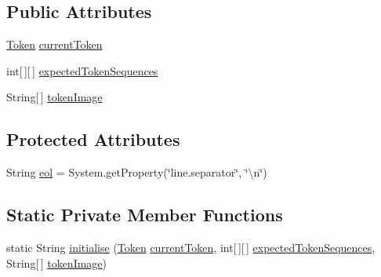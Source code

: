 \subsection*{Public Attributes}
\begin{DoxyCompactItemize}
\item 
\hyperlink{classuk_1_1ac_1_1manchester_1_1cs_1_1owl_1_1owlapi_1_1turtle_1_1parser_1_1_token}{Token} \hyperlink{classuk_1_1ac_1_1manchester_1_1cs_1_1owl_1_1owlapi_1_1turtle_1_1parser_1_1_parse_exception_a3a9b65aacfb71f6029fd7fd37fdcc633}{current\-Token}
\item 
int\mbox{[}$\,$\mbox{]}\mbox{[}$\,$\mbox{]} \hyperlink{classuk_1_1ac_1_1manchester_1_1cs_1_1owl_1_1owlapi_1_1turtle_1_1parser_1_1_parse_exception_a08ab7f2d8391b1238530a95a82e17dfc}{expected\-Token\-Sequences}
\item 
String\mbox{[}$\,$\mbox{]} \hyperlink{classuk_1_1ac_1_1manchester_1_1cs_1_1owl_1_1owlapi_1_1turtle_1_1parser_1_1_parse_exception_aabd598309c7cc746f65237927c4cb3a1}{token\-Image}
\end{DoxyCompactItemize}
\subsection*{Protected Attributes}
\begin{DoxyCompactItemize}
\item 
String \hyperlink{classuk_1_1ac_1_1manchester_1_1cs_1_1owl_1_1owlapi_1_1turtle_1_1parser_1_1_parse_exception_a93dac0f8ebcb3f59141c01d54a3da3c1}{eol} = System.\-get\-Property(\char`\"{}line.\-separator\char`\"{}, \char`\"{}\textbackslash{}n\char`\"{})
\end{DoxyCompactItemize}
\subsection*{Static Private Member Functions}
\begin{DoxyCompactItemize}
\item 
static String \hyperlink{classuk_1_1ac_1_1manchester_1_1cs_1_1owl_1_1owlapi_1_1turtle_1_1parser_1_1_parse_exception_a101ebd1f7e601b6951eee813ef9e18ed}{initialise} (\hyperlink{classuk_1_1ac_1_1manchester_1_1cs_1_1owl_1_1owlapi_1_1turtle_1_1parser_1_1_token}{Token} \hyperlink{classuk_1_1ac_1_1manchester_1_1cs_1_1owl_1_1owlapi_1_1turtle_1_1parser_1_1_parse_exception_a3a9b65aacfb71f6029fd7fd37fdcc633}{current\-Token}, int\mbox{[}$\,$\mbox{]}\mbox{[}$\,$\mbox{]} \hyperlink{classuk_1_1ac_1_1manchester_1_1cs_1_1owl_1_1owlapi_1_1turtle_1_1parser_1_1_parse_exception_a08ab7f2d8391b1238530a95a82e17dfc}{expected\-Token\-Sequences}, String\mbox{[}$\,$\mbox{]} \hyperlink{classuk_1_1ac_1_1manchester_1_1cs_1_1owl_1_1owlapi_1_1turtle_1_1parser_1_1_parse_exception_aabd598309c7cc746f65237927c4cb3a1}{token\-Image})
\end{DoxyCompactItemize}
